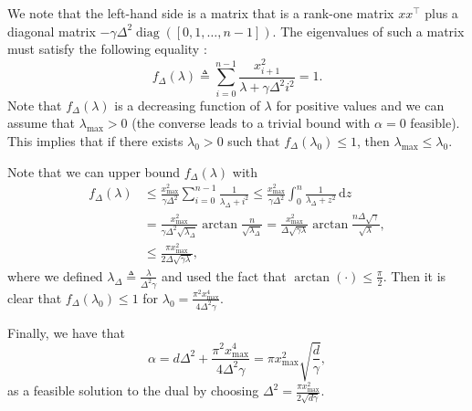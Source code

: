 \documentclass{article}
\DeclareMathOperator{\diag}{diag}
\def \dx{\, \mathrm{d}}
\begin{document}
We note that the left-hand side is a matrix that is a rank-one matrix $x x^\top$ plus a diagonal matrix $-\gamma \Delta^2 \diag([0,1,\ldots,n-1])$. The eigenvalues of such a matrix must satisfy the following equality \cite{golub}:
\[ f_\Delta(\lambda) \triangleq \sum_{i=0}^{n-1} \frac{x_{i+1}^2}{\lambda + \gamma \Delta^2 i^2} = 1. \]
Note that $f_\Delta(\lambda)$ is a decreasing function of $\lambda$ for positive values and we can assume that $\lambda_{\max} > 0$ (the converse leads to a trivial bound with $\alpha = 0$ feasible). This implies that if there exists $\lambda_0 > 0$ such that $f_\Delta(\lambda_0) \leq 1$, then $\lambda_{\max} \leq \lambda_0$. %

Note that we can upper bound $f_\Delta(\lambda)$ with
\begin{align*}
  f_\Delta(\lambda) & \leq \frac{x_{\max}^2}{\gamma \Delta^2} \sum_{i=0}^{n-1} \frac{1}{\lambda_\Delta + i^2} \leq \frac{x_{\max}^2}{\gamma \Delta^2} \int_{0}^{n} \frac{1}{\lambda_\Delta + z^2} \dx z \\
  & = \frac{x_{\max}^2}{\gamma \Delta^2 \sqrt{\lambda_\Delta}} \arctan\frac{n}{\sqrt{\lambda_\Delta}} = \frac{x_{\max}^2}{\Delta \sqrt{\gamma \lambda}} \arctan\frac{n \Delta \sqrt{\gamma}}{\sqrt{\lambda}}, \\
  & \leq \frac{\pi x_{\max}^2}{2 \Delta \sqrt{\gamma \lambda}},
\end{align*}
where we defined $\lambda_\Delta \triangleq \frac{\lambda}{\Delta^2 \gamma}$ and used the fact that $\arctan (\cdot) \leq \frac{\pi}{2}$. Then it is clear that $f_\Delta(\lambda_0) \leq 1$ for $\lambda_0 = \frac{\pi^2 x_{\max}^4}{4 \Delta^2 \gamma}$. 

Finally, we have that
\[ \alpha = d \Delta^2 + \frac{\pi^2 x_{\max}^4}{4 \Delta^2 \gamma} = \pi x_{\max}^2 \sqrt{\frac{d}{\gamma}}, \]
as a feasible solution to the dual by choosing $\Delta^2 = \frac{\pi x_{\max}^2}{2 \sqrt{d \gamma}}$.

\end{document}

